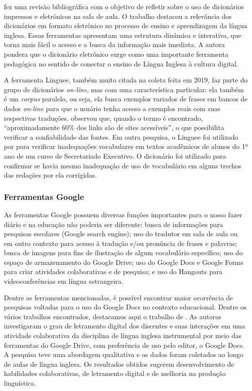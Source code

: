 \documentclass[portuguese]{textolivre}
\begin{document}
\textcite{pereira_o_2017} fez uma revisão bibliográfica com o objetivo de refletir sobre o uso de dicionários impressos e eletrônicos na sala de aula. O trabalho destacou a relevância dos dicionários em formato eletrônico no processo de ensino e aprendizagem da língua inglesa. Essas ferramentas apresentam uma estrutura dinâmica e interativa, que torna mais fácil o acesso e a busca da informação mais imediata. A autora pondera que o dicionário eletrônico surge como uma importante ferramenta pedagógica no sentido de conectar o ensino de Língua Inglesa à cultura digital.

A ferramenta Linguee, também muito citada na coleta feita em 2019, faz parte do grupo de dicionários \textit{on-line}, mas com uma característica particular: ela também é um \textit{corpus} paralelo, ou seja, ela busca exemplos variados de frases em bancos de dados \textit{on-line} para que o usuário tenha acesso a exemplos reais com suas respectivas traduções. \textcite{aguiar_desafios_2018} observou que, quando o termo é encontrado, “aproximadamente 60\% dos links são de sites acessíveis”, o que possibilita verificar a confiabilidade das fontes. Em outra pesquisa, o Linguee foi utilizado por \textcite{grespan_escrita_2017} para verificar inadequações vocabulares em textos acadêmicos de alunos do 1º ano de um curso de Secretariado Executivo. O dicionário foi utilizado para confirmar se havia mesmo inadequação de uso de vocabulário em alguns trechos das redações por ela corrigidas.

\subsubsection{Ferramentas Google}\label{sec-titulo}
As ferramentas Google possuem diversas funções importantes para o nosso fazer diário e na educação não poderia ser diferente: busca de informações para pesquisas escolares (Google search engine); uso do tradutor em sala de aula ou em outro contexto para acesso à tradução e/ou pronúncia de frases e palavras; busca de imagens para fins de ilustração de algum vocabulário específico; uso do espaço de armazenamento do Google Drive;  uso do Google Docs e Google Forms para criar atividades colaborativas e de pesquisa; e uso do Hangouts para videoconferências em língua estrangeira.

Dentre as ferramentas mencionadas, é possível encontrar maior ocorrência de pesquisas voltadas para o uso do Google Docs no contexto educacional. Dentre os vários trabalhos encontrados, destacamos aqui o trabalho de \textcite{santiago_google_2014}. As autoras investigaram o grau de letramento digital dos discentes e suas interações em uma atividade colaborativa da disciplina de língua inglesa instrumental por meio das ferramentas do Google Drive, com preferência de uso pelo editor, o Google Docs. A pesquisa teve uma abordagem qualitativa e os dados foram coletados ao longo de aulas de língua inglesa. Os resultados obtidos sugerem desenvolvimento de habilidades colaborativas, de letramento digital e de melhoria na produção linguística.
\end{document}
